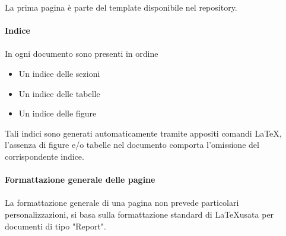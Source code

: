 \documentclass[a4paper]{report}
\begin{document}
	La prima pagina è parte del template disponibile nel repository. \\ \\
	\textbf{Indice} \\ \\
	In ogni documento sono presenti in ordine
	\begin{itemize}
		\item Un indice delle sezioni
		\item Un indice delle tabelle
		\item Un indice delle figure
	\end{itemize}
	Tali indici sono generati automaticamente tramite appositi comandi \LaTeX, l'assenza di figure 
	e/o tabelle nel documento comporta l'omissione del corrispondente indice. \\ \\
	\textbf{Formattazione generale delle pagine} \\ \\
	La formattazione generale di una pagina non prevede particolari personalizzazioni, si basa 
	sulla formattazione standard di \LaTeX \space usata per documenti di tipo "Report". 
\end{document}
